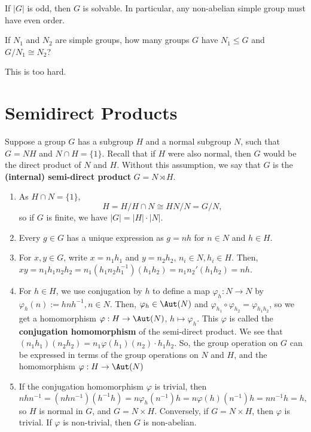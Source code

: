 \begin{thm}
    If $|G|$ is odd, then $G$ is solvable. In particular, any non-abelian simple group must have even order.
\end{thm}

\begin{notebox*}[Question]
    If $N_1$ and $N_2$ are simple groups, how many groups $G$ have $N_1 \leq G$ and $G/N_1 \cong N_2$?
\end{notebox*}
This is too hard.

\section{Semidirect Products}

\begin{defn}
    Suppose a group $G$ has a subgroup $H$ and a normal subgroup $N$, such that $G = NH$ and $N \cap H = \{1\}$. Recall that if $H$ were also normal, then $G$ would be the direct product of $N$ and $H$. Without this assumption, we say that $G$ is the \textbf{(internal) semi-direct product} $G = N \rtimes H$.
\end{defn}

\begin{rmk}
    \begin{enumerate}
        \item As $H \cap N=\{1\}$,
        $$H=H/H \cap N \cong HN /N = G/N,$$
        so if $G$ is finite, we have $|G| = |H| \cdot |N|$.
        \item Every $g \in G$ has a unique expression as $g=nh$ for $n \in N$ and $h \in H$.
        \item For $x,y \in G$, write $x=n_1h_1$ and $y=n_2h_2$, $n_i \in N,h_i \in H$. Then, $xy= n_1h_1n_2h_2=n_1(h_1n_2h_1^{-1})(h_1h_2)=n_1n_2'(h_1h_2)=nh$.
        \item For $h \in H$, we use conjugation by $h$ to define a map $\varphi_h:N \to N$ by $\varphi_h(n):=hnh^{-1},n \in N$. Then, $\varphi _h \in \Aut(N)$ and $\varphi_{h_1}\circ \varphi_{h_2}=\varphi_{h_1h_2}$, so we get a homomorphism $\varphi :H \to \Aut (N)$, $h \mapsto \varphi _h$. This $\varphi$ is called the \textbf{conjugation homomorphism} of the semi-direct product. We see that $(n_1h_1)(n_2h_2) = n_1\varphi(h_1)(n_2)\cdot h_1h_2$. So, the group operation on $G$ can be expressed in terms of the group operations on $N$ and $H$, and the homomorphism $\varphi :H \to \Aut (N)$
        \item If the conjugation homomorphism $\varphi$ is trivial, then
        $$nhn^{-1}=(nhn^{-1})(h^{-1}h)=n\varphi_h(n^{-1})h=n\varphi(h)(n^{-1})h=nn^{-1}h=h,$$
        so $H$ is normal in $G$, and $G = N \times H$. Conversely, if $G = N\times H$, then $\varphi$ is trivial. If $\varphi$ is non-trivial, then $G$ is non-abelian.
    \end{enumerate}
\end{rmk}

